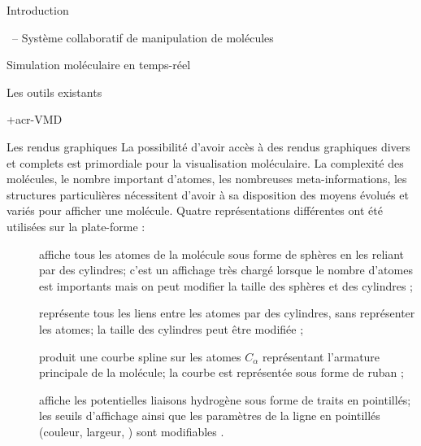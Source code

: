 \documentclass[myfrancais]{mythesis}
\begin{document}
\begin{mypart}{Introduction}
\begin{mychapter}{\myShaddock\ -- Système collaboratif de manipulation de molécules}
\begin{mysection}{Simulation moléculaire en temps-réel}
\begin{mysubsection}{Les outils existants}
\begin{mysubsubsection}{\myacronl+{acr-VMD}}
						\begin{myparagraph}{Les rendus graphiques}
							La possibilité d'avoir accès à des rendus graphiques divers et complets est primordiale pour la visualisation moléculaire.
							La complexité des molécules, le nombre important d'atomes, les nombreuses meta-informations, les structures particulières nécessitent d'avoir à sa disposition des moyens évolués et variés pour afficher une molécule.
							Quatre représentations différentes  ont été utilisées sur la plate-forme \myShaddock :
							\begin{description}
								\item[\myCPK] affiche tous les atomes de la molécule sous forme de sphères en les reliant par des cylindres; c'est un affichage très chargé lorsque le nombre d'atomes est importants mais on peut modifier la taille des sphères et des cylindres ;
								\item[\myLicorice] représente tous les liens entre les atomes par des cylindres, sans représenter les atomes; la taille des cylindres peut être modifiée ;
								\item[\myNewRibbon] produit une courbe spline sur les atomes $C_{\alpha}$ représentant l'armature principale de la molécule; la courbe est représentée sous forme de ruban ;
								\item[\myHBonds] affiche les potentielles liaisons hydrogène sous forme de traits en pointillés; les seuils d'affichage ainsi que les paramètres de la ligne en pointillés (couleur, largeur, \myetc) sont modifiables .
							\end{description}


\end{myparagraph}
\end{mysubsubsection}
\end{mysubsection}
\end{mysection}
\end{mychapter}
\end{mypart}
\end{document}
